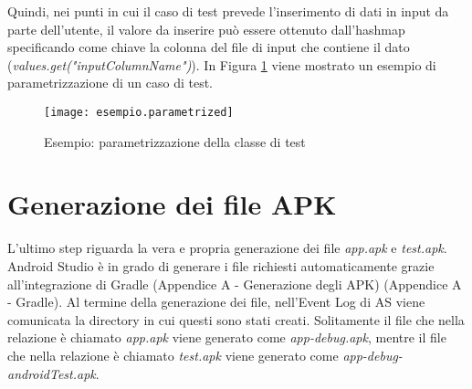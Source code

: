 \bigskip

\noindent Quindi, nei punti in cui il caso di test prevede l'inserimento di dati in input da parte dell'utente, il valore da inserire può essere ottenuto dall'hashmap specificando come chiave la colonna del file di input che contiene il dato  (\emph{values.get("inputColumnName")}). In Figura \ref{fig:esempio.parametrized} viene mostrato un esempio di parametrizzazione di un caso di test.

\begin{figure}[H]
	\texttt{[image: esempio.parametrized]}
	\centering
	\caption{Esempio: parametrizzazione della classe di test}
    \label{fig:esempio.parametrized}
\end{figure}

\section{Generazione dei file APK}
L'ultimo step riguarda la vera e propria generazione dei file \emph{app.apk} e \emph{test.apk}. Android Studio è in grado di generare i file richiesti automaticamente grazie all'integrazione di Gradle (Appendice A - Generazione degli APK) (Appendice A - Gradle). Al termine della generazione dei file, nell'Event Log di AS viene comunicata la directory in cui questi sono stati creati.  Solitamente il file che nella relazione è chiamato \emph{app.apk} viene generato come \emph{app-debug.apk}, mentre il file che nella relazione è chiamato \emph{test.apk} viene generato come \emph{app-debug-androidTest.apk}.


